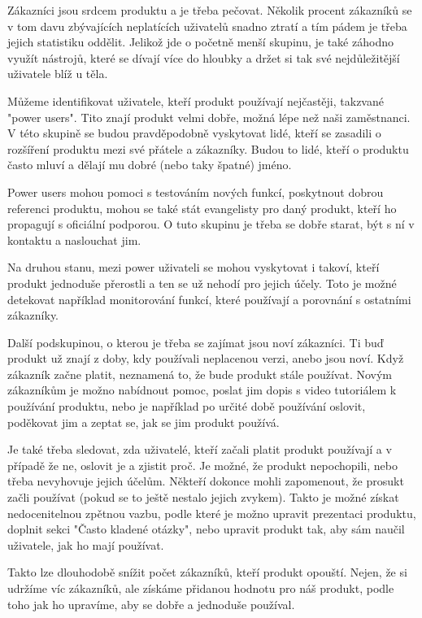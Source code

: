\documentclass[bc,female,java,dept456]{diploma}						%
\begin{document}
Zákazníci jsou srdcem produktu a je třeba pečovat. Několik procent zákazníků se v tom davu zbývajících neplatících uživatelů snadno ztratí a tím pádem je třeba jejich statistiku oddělit. Jelikož jde o početně menší skupinu, je také záhodno využít nástrojů, které se dívají více do hloubky a držet si tak své nejdůležitější uživatele blíž u těla. 

Můžeme identifikovat uživatele, kteří produkt používají nejčastěji, takzvané "power users". Tito znají produkt velmi dobře, možná lépe než naši zaměstnanci. V této skupině se budou pravděpodobně vyskytovat lidé, kteří se zasadili o rozšíření produktu mezi své přátele a zákazníky. Budou to lidé, kteří o produktu často mluví a dělají mu dobré (nebo taky špatné) jméno.

Power users mohou pomoci s testováním nových funkcí, poskytnout dobrou referenci produktu, mohou se také stát evangelisty pro daný produkt, kteří ho propagují s oficiální podporou. O tuto skupinu je třeba se dobře starat, být s ní v kontaktu a naslouchat jim. 

Na druhou stanu, mezi power uživateli se mohou vyskytovat i takoví, kteří produkt jednoduše přerostli a ten se už nehodí pro jejich účely. Toto je možné detekovat například monitorování funkcí, které používají a porovnání s ostatními zákazníky.

Další podskupinou, o kterou je třeba se zajímat jsou noví zákazníci. Ti buď produkt už znají z doby, kdy používali neplacenou verzi, anebo jsou noví. Když zákazník začne platit, neznamená to, že bude produkt stále používat. Novým zákazníkům je možno nabídnout pomoc, poslat jim dopis s video tutoriálem k používání produktu, nebo je například po určité době používání oslovit, poděkovat jim a zeptat se, jak se jim produkt používá.

Je také třeba sledovat, zda uživatelé, kteří začali platit produkt používají a v případě že ne, oslovit je a zjistit proč. Je možné, že produkt nepochopili, nebo třeba nevyhovuje jejich účelům. Někteří dokonce mohli zapomenout, že prosukt začli používat (pokud se to ještě nestalo jejich zvykem). Takto je možné získat nedocenitelnou zpětnou vazbu, podle které je možno upravit prezentaci produktu, doplnit sekci "Často kladené otázky", nebo upravit produkt tak, aby sám naučil uživatele, jak ho mají používat. 

Takto lze dlouhodobě snížit počet zákazníků, kteří produkt opouští. Nejen, že si udržíme víc zákazníků, ale získáme přidanou hodnotu pro náš produkt, podle toho jak ho upravíme, aby se dobře a jednoduše používal.
\end{document}
